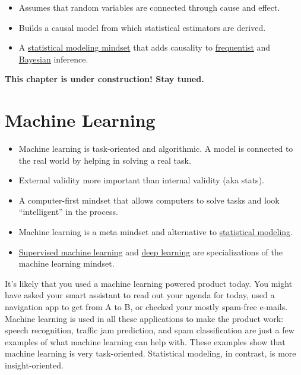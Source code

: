 \documentclass[
  10pt,
]{scrbook}
\providecommand{\tightlist}{%
  \setlength{\itemsep}{0pt}\setlength{\parskip}{0pt}}
\begin{document}
\begin{itemize}
\tightlist
\item
  Assumes that random variables are connected through cause and effect.
\item
  Builds a causal model from which statistical estimators are derived.
\item
  A \protect\hyperlink{statistical-modeling}{statistical modeling mindset} that adds causality to \protect\hyperlink{frequentist-inference}{frequentist} and \protect\hyperlink{bayesian-inference}{Bayesian} inference.
\end{itemize}

\textbf{This chapter is under construction! Stay tuned.}

\hypertarget{machine-learning}{%
\chapter{Machine Learning}\label{machine-learning}}

\begin{itemize}
\tightlist
\item
  Machine learning is task-oriented and algorithmic. A model is connected to the real world by helping in solving a real task.
\item
  External validity more important than internal validity (aka stats).
\item
  A computer-first mindset that allows computers to solve tasks and look ``intelligent'' in the process.
\item
  Machine learning is a meta mindset and alternative to \protect\hyperlink{statistical-ml}{statistical modeling}.
\item
  \protect\hyperlink{supervised-ml}{Supervised machine learning} and \protect\hyperlink{deep-learning}{deep learning} are specializations of the machine learning mindset.
\end{itemize}

It's likely that you used a machine learning powered product today.
You might have asked your smart assistant to read out your agenda for today, used a navigation app to get from A to B, or checked your mostly spam-free e-mails.
Machine learning is used in all these applications to make the product work: speech recognition, traffic jam prediction, and spam classification are just a few examples of what machine learning can help with.
These examples show that machine learning is very task-oriented.
Statistical modeling, in contrast, is more insight-oriented.
\end{document}

